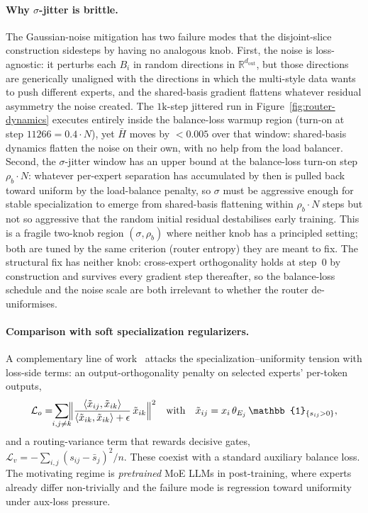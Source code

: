 \documentclass[10pt]{article}
\newcommand{\Rb}{\mathbb{R}}
\begin{document}
\paragraph{Why $\sigma$-jitter is brittle.}
The Gaussian-noise mitigation has two failure modes that the
disjoint-slice construction sidesteps by having no analogous knob.
First, the noise is loss-agnostic: it perturbs each $B_i$ in random
directions in $\Rb^{d_{\mathrm{out}}}$, but those directions are
generically unaligned with the directions in which the multi-style
data wants to push different experts, and the shared-basis gradient
flattens whatever residual asymmetry the noise created. The
$1\text{k}$-step jittered run in Figure~\ref{fig:router-dynamics}
executes entirely inside the balance-loss warmup region (turn-on at
step $11266 = 0.4\!\cdot\!N$), yet $\bar H$ moves by $<\!0.005$ over
that window: shared-basis dynamics flatten the noise on their own,
with no help from the load balancer. Second, the $\sigma$-jitter
window has an upper bound at the balance-loss turn-on step
$\rho_b\!\cdot\!N$: whatever per-expert separation has accumulated
by then is pulled back toward uniform by the load-balance penalty,
so $\sigma$ must be aggressive enough for stable specialization to
emerge from shared-basis flattening within $\rho_b\!\cdot\!N$ steps
but not so aggressive that the random initial residual destabilises
early training. This is a fragile two-knob region $(\sigma, \rho_b)$
where neither knob has a principled setting; both are tuned by the
same criterion (router entropy) they are meant to fix. The structural
fix has neither knob: cross-expert orthogonality holds at step~$0$
by construction and survives every gradient step thereafter, so the
balance-loss schedule and the noise scale are both irrelevant to
whether the router de-uniformises.

\paragraph{Comparison with soft specialization regularizers.}
A complementary line of work~\cite{guo2025advancing} attacks the
specialization--uniformity tension with loss-side terms: an
output-orthogonality penalty on selected experts' per-token outputs,
\[
\mathcal{L}_o = \!\!\sum_{i,j\neq k}\!\!
\Bigl\lVert
\frac{\langle \tilde x_{ij}, \tilde x_{ik}\rangle}
     {\langle \tilde x_{ik}, \tilde x_{ik}\rangle + \epsilon}
\,\tilde x_{ik}
\Bigr\rVert^2
\quad\text{with}\quad
\tilde x_{ij} = x_i\,\theta_{E_j}\,\mathbb{1}_{\{s_{ij}>0\}},
\]
and a routing-variance term that rewards decisive gates,
$\mathcal{L}_v = -\sum_{i,j}(s_{ij} - \bar s_j)^2/n$. These coexist
with a standard auxiliary balance loss. The motivating regime is
\emph{pretrained} MoE LLMs in post-training, where experts already
differ non-trivially and the failure mode is regression toward
uniformity under aux-loss pressure.
\end{document}
